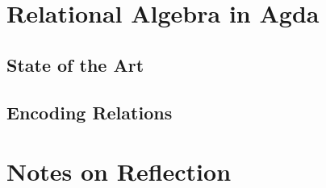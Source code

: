 \documentclass{report}
\begin{document}
\chapter{Relational Algebra in Agda}
\label{chap:relationalalgebrainagda}


  \section{State of the Art}
  \label{sec:relalg_sota}
  

  \section{Encoding Relations}
  \label{chap:relationalalgebra}
  
  
\chapter{Notes on Reflection}
\label{chap:reflection}





\end{document}

